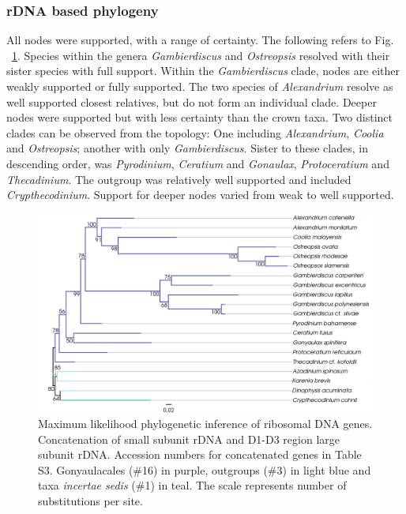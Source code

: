 \documentclass[12pt]{article}
\begin{document}
\subsubsection*{rDNA based phylogeny}
\FloatBarrier 
All nodes were supported, with a range of certainty.
The following refers to Fig. ~\ref{fig:rdna}.
Species within the genera \emph{Gambierdiscus} and \emph{Ostreopsis} resolved with their sister species with full support. 
Within the \emph{Gambierdiscus} clade, nodes are either weakly supported or fully supported. 
The two species of \emph{Alexandrium} resolve as well supported closest relatives, but do not form an individual clade. 
Deeper nodes were supported but with less certainty than the crown taxa. 
Two distinct clades can be observed from the topology: One including \emph{Alexandrium}, \emph{Coolia} and \emph{Ostreopsis}; another with only \emph{Gambierdiscus}. 
Sister to these clades, in descending order, was \emph{Pyrodinium}, \emph{Ceratium} and \emph{Gonaulax}, \emph{Protoceratium} and \emph{Thecadinium}. 
The outgroup was relatively well supported and included \emph{Crypthecodinium}. 
Support for deeper nodes varied from weak to well supported.

\begin{figure} 
\includegraphics[scale=.4]{figures/rDNA-ML.png} 
\caption{Maximum likelihood phylogenetic inference of ribosomal DNA genes. Concatenation of small subunit rDNA and D1-D3 region large subunit rDNA. Accession numbers for concatenated genes in Table S3. Gonyaulacales (\#16) in purple, outgroups (\#3) in light blue and taxa \textit{incertae sedis} (\#1) in teal. The scale represents number of substitutions per site.} 
\label{fig:rdna}
\end{figure} 
\FloatBarrier
\end{document}
